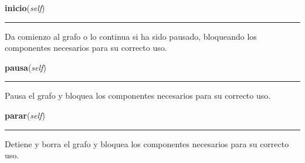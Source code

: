     \label{manejoGrafico:ManejoGrafico:inicio}

    \vspace{0.5ex}

\hspace{.8\funcindent}\begin{boxedminipage}{\funcwidth}

    \raggedright \textbf{inicio}(\textit{self})

    \vspace{-1.5ex}

    \rule{\textwidth}{0.5\fboxrule}
\setlength{\parskip}{2ex}
    Da comienzo al grafo o lo continua si ha sido pausado, bloqueando los 
    componentes necesarios para su correcto uso.

\setlength{\parskip}{1ex}
    \end{boxedminipage}

    \label{manejoGrafico:ManejoGrafico:pausa}

    \vspace{0.5ex}

\hspace{.8\funcindent}\begin{boxedminipage}{\funcwidth}

    \raggedright \textbf{pausa}(\textit{self})

    \vspace{-1.5ex}

    \rule{\textwidth}{0.5\fboxrule}
\setlength{\parskip}{2ex}
    Pausa el grafo y bloquea los componentes necesarios para su correcto 
    uso.

\setlength{\parskip}{1ex}
    \end{boxedminipage}

    \label{manejoGrafico:ManejoGrafico:parar}

    \vspace{0.5ex}

\hspace{.8\funcindent}\begin{boxedminipage}{\funcwidth}

    \raggedright \textbf{parar}(\textit{self})

    \vspace{-1.5ex}

    \rule{\textwidth}{0.5\fboxrule}
\setlength{\parskip}{2ex}
    Detiene y borra el grafo y bloquea los componentes necesarios para su 
    correcto uso.

\setlength{\parskip}{1ex}
    \end{boxedminipage}


